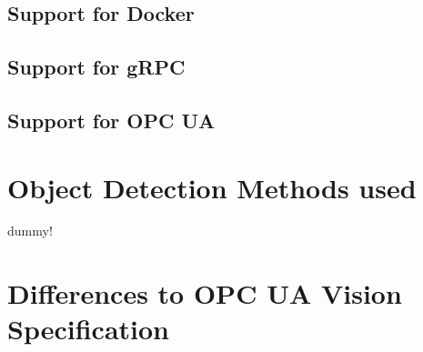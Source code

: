 \subsection{Support for Docker}

\subsection{Support for gRPC}

\subsection{Support for OPC UA}

\section{Object Detection Methods used}
dummy!

\section{Differences to OPC UA Vision Specification}